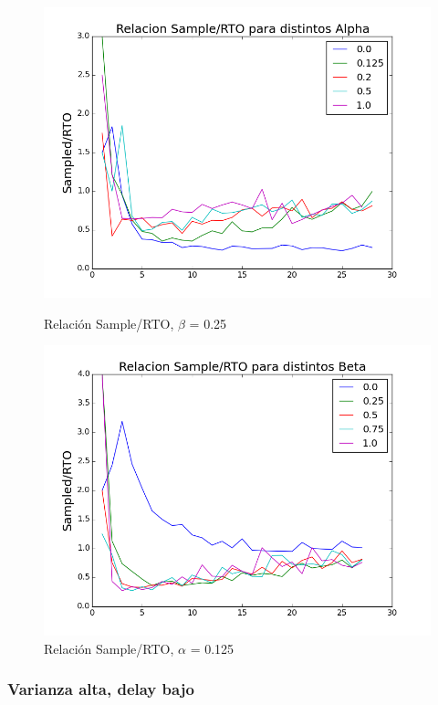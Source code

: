 \begin{figure}[H]
\begin{minipage}{0.5\linewidth}
\includegraphics[width=\linewidth]{../graficos/alphad01var2drop0.png}
\caption{Relación Sample/RTO, $\beta$ = 0.25}\label{fig:alpha-var2-drop0}
\end{minipage}
\hfill
\begin{minipage}{0.5\linewidth}
\includegraphics[width=\linewidth]{../graficos/betad01var2drop0.png}
\caption{Relación Sample/RTO, $\alpha$ = 0.125}\label{fig:beta-var2-drop0}
\end{minipage}
\end{figure}

\subsubsection{Varianza alta, delay bajo}

